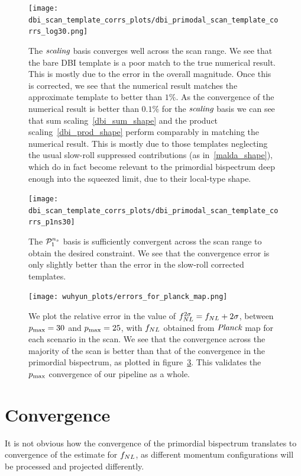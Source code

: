 \begin{figure}[!pth]
\centering
\texttt{[image: dbi\_scan\_template\_corrs\_plots/dbi\_primodal\_scan\_template\_corrs\_log30.png]}
\caption{
    The $\textit{scaling}$ basis converges well across the scan range.
    We see that the bare DBI template is a poor match to the true numerical result.
    This is mostly due to the error in the overall magnitude.
    Once this is corrected, we see that the numerical result matches the
    approximate template to better than $1\%$. As the convergence of the
    numerical result is better than $0.1\%$ for the $\textit{scaling}$ basis
    we can see that sum scaling~\eqref{dbi_sum_shape} and the
    product scaling~\eqref{dbi_prod_shape} perform
    comparably in matching the numerical result. This is mostly
    due to those templates neglecting the usual slow-roll suppressed
    contributions (as in~\eqref{malda_shape}),
    which do in fact become relevant to the primordial
    bispectrum deep enough into the squeezed limit, due to their local-type shape.
}\label{fig:dbi_primodal_scan_template_corrs_log30}
\end{figure}
\begin{figure}[!pth]
\centering
\texttt{[image: dbi\_scan\_template\_corrs\_plots/dbi\_primodal\_scan\_template\_corrs\_p1ns30]}
\caption{
    The $\mathcal{P}^{n_s}_1$ basis is sufficiently convergent across the scan range
    to obtain the desired constraint.
    We see that the convergence error is only slightly better than the error
    in the slow-roll corrected templates.
}\label{fig:dbi_primodal_scan_template_corrs_p1ns}
\end{figure}
\begin{figure}[!pth]
\centering
\texttt{[image: wuhyun\_plots/errors\_for\_planck\_map.png]}
\caption{
    We plot the relative error in the value of $f_{NL}^{2\sigma}=f_{NL}+2\sigma$,
    between $p_\text{max}=30$ and $p_\text{max}=25$,
    with $f_{NL}$ obtained from $\textit{Planck}$ map for each scenario in the scan.
    We see that the convergence across the majority of the scan is better than that of the
    convergence in the primordial bispectrum, as plotted in figure~\ref{fig:dbi_primodal_scan_template_corrs_p1ns}.
    This validates the $p_\text{max}$ convergence of our pipeline as a whole.
}\label{fig:dbi_primodal_scan_template_corrs_p1ns}
\end{figure}


\section{Convergence}
    It is not obvious how the convergence of the primordial bispectrum translates to
    convergence of the estimate for $f_{NL}$, as different
    momentum configurations will be processed and projected differently.


